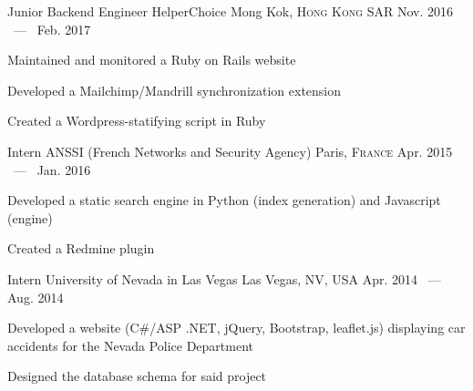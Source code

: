

\begin{cventries}

  \cventry
    {Junior Backend Engineer} %
    {HelperChoice} %
    {Mong Kok, \textsc{Hong Kong SAR} \emojiflaghk} %
    {Nov. 2016 ~---~ Feb. 2017} %
    {
      \begin{cvitems} %
        \item {Maintained and monitored a Ruby on Rails website}
        \item {Developed a Mailchimp/Mandrill synchronization extension}
        \item {Created a Wordpress-statifying script in Ruby}
      \end{cvitems}
    }

  \cventry
    {Intern} %
    {ANSSI (French Networks and Security Agency)} %
    {Paris, \textsc{France} \emojiflagfr} %
    {Apr. 2015 ~---~ Jan. 2016} %
    {
      \begin{cvitems} %
        \item {Developed a static search engine in Python (index generation) and
          Javascript (engine)}
        \item {Created a Redmine plugin}
      \end{cvitems}
    }

  \cventry
    {Intern} %
    {University of Nevada in Las Vegas} %
    {Las Vegas, NV, USA \emojiflagus} %
    {Apr. 2014 ~---~ Aug. 2014} %
    {
      \begin{cvitems} %
        \item {Developed a website (C\#/ASP .NET, jQuery, Bootstrap, leaflet.js) displaying car accidents for the Nevada Police Department}
        \item {Designed the database schema for said project}
      \end{cvitems}
    }

\end{cventries}
